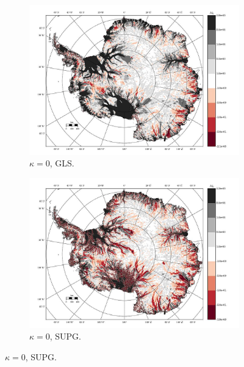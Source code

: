 \begin{figure}

  \centering

  \begin{subfigure}[b]{0.45\linewidth}
    \includegraphics[width=\linewidth]{images/balance_velocity/antarctica/misfit_10H_kappa_0_GLS.jpg}
  \caption{$\kappa = 0$, GLS.}
  \label{antarctica_bv_image_kappa_0_GLS_misfit}
  \end{subfigure}
  \begin{subfigure}[b]{0.45\linewidth}
    \includegraphics[width=\linewidth]{images/balance_velocity/antarctica/misfit_10H_kappa_0_SUPG.jpg}
  \caption{$\kappa = 0$, SUPG.}
  \label{antarctica_bv_image_kappa_0_SUPG_misfit}
  \end{subfigure}


\end{figure}
